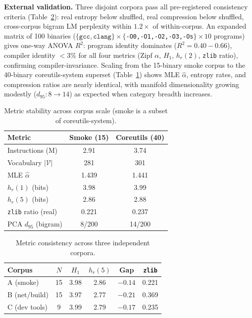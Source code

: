 \documentclass[conference]{IEEEtran}
\newcommand{\hr}[1]{h_r(#1)}
\newcommand{\zlib}{\texttt{zlib}}
\begin{document}
\textbf{External validation.}
Three disjoint corpora pass all pre-registered consistency criteria
(Table~\ref{tab:corpora}): real entropy below shuffled, real compression
below shuffled, cross-corpus bigram LM perplexity within $1.2\times$ of
within-corpus.  An expanded matrix of 100 binaries
($\{\mathtt{gcc},\mathtt{clang}\}\times\{$\texttt{-O0,-O1,-O2,-O3,-Os}$\}\times 10$
programs) gives one-way ANOVA $R^2$: program identity dominates
($R^2{=}0.40{-}0.66$), compiler identity ${<}3\%$ for all four metrics
(Zipf $\alpha$, $H_1$, $\hr{2}$, \zlib{} ratio), confirming
compiler-invariance.  Scaling from the 15-binary smoke corpus to the
40-binary coreutils-system superset
(Table~\ref{tab:scaling}) shows MLE $\hat{\alpha}$, entropy rates,
and compression ratios are nearly identical, with manifold
dimensionality growing modestly ($d_{95}{:}8{\to}14$) as expected
when category breadth increases.

\begin{table}[t]
\centering
\caption{Metric stability across corpus scale (smoke is a subset of
         coreutils-system).}
\label{tab:scaling}
\begin{tabular}{@{}lcc@{}}
\toprule
\textbf{Metric} & \textbf{Smoke (15)} & \textbf{Coreutils (40)} \\
\midrule
Instructions (M)             & 2.91  & 3.74  \\
Vocabulary $|\mathcal{V}|$   & 281   & 301   \\
MLE $\hat{\alpha}$           & 1.439 & 1.441 \\
$\hr{1}$ (bits)              & 3.98  & 3.99  \\
$\hr{5}$ (bits)              & 2.86  & 2.88  \\
\zlib{} ratio (real)         & 0.221 & 0.237 \\
PCA $d_{95}$ (bigram)        & 8/200 & 14/200 \\
\bottomrule
\end{tabular}
\end{table}

\begin{table}[t]
\centering
\caption{Metric consistency across three independent corpora.}
\label{tab:corpora}
\begin{tabular}{@{}lccccc@{}}
\toprule
\textbf{Corpus} & $N$ & $H_1$ & $\hr{5}$ & \textbf{Gap} & \zlib{} \\
\midrule
A (smoke)     & 15 & 3.98 & 2.86 & $-0.14$ & 0.221 \\
B (net/build) & 15 & 3.97 & 2.77 & $-0.21$ & 0.369 \\
C (dev tools) &  9 & 3.99 & 2.79 & $-0.17$ & 0.235 \\
\bottomrule
\end{tabular}
\end{table}
\end{document}
